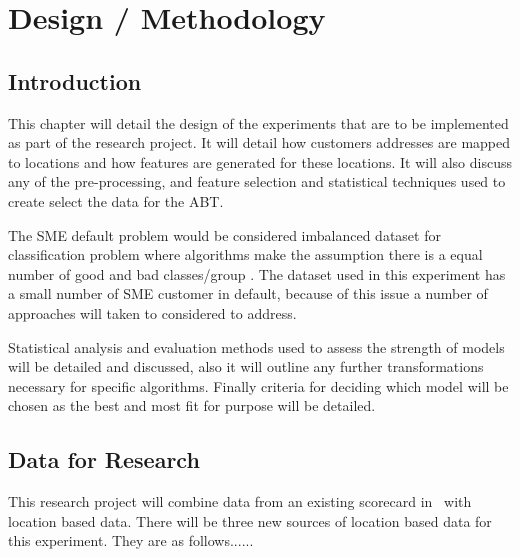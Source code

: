 
\chapter{Design / Methodology} %

\label{Chapter3} %


\section{Introduction}

This chapter will detail the design of the experiments that are to be implemented as part of the research project. It will detail how customers addresses are mapped to locations and how features are generated for these locations. It will also discuss any of the pre-processing, and feature selection and statistical techniques used to create select the data for the ABT.

The SME default problem would be considered imbalanced dataset for classification problem where algorithms make the assumption there is a equal number of good and bad classes/group \citep{japkowicz_class_2000}. The dataset used in this experiment has a small number of SME customer in default, because of this issue a number of approaches will taken to considered to address.

Statistical analysis and evaluation methods used to assess the strength of models will be detailed and discussed, also it will outline any further transformations necessary for specific algorithms. Finally criteria for deciding which model will be chosen as the best and most fit for purpose will be detailed.

\section{Data for Research}
This research project will combine data from an existing scorecard in \subjectname\ with location based data. There will be three new sources of location based data for this experiment. They are as follows......

